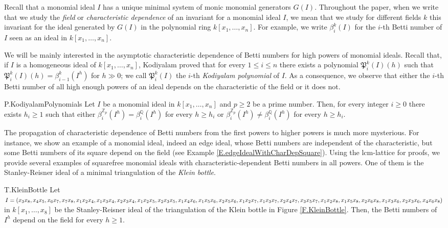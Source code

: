 \documentclass[11pt,oneside]{amsart}
\theoremstyle{plain}
\theoremstyle{definition}
\newcommand{\Q}{\mathbb{Q}}
\newcommand{\Z}{\mathbb{Z}}
\begin{document}
Recall that a monomial ideal $I$ has a unique minimal system of monic monomial generators $G(I)$.
Throughout the paper, when we write that we study the \textit{field} or \textit{characteristic dependence} of an invariant for a monomial ideal $I$, 
we mean that we study for different fields $k$ this invariant for the ideal generated by $G(I)$ in the polynomial ring $k[x_1, \dots, x_n]$. For example, we write $\beta_i^k(I)$ for the $i$-th Betti number of $I$ seen as an ideal in $k[x_1, \dots, x_n]$.   

We will be mainly interested in the asymptotic characteristic dependence of Betti numbers for high powers of monomial ideals. 
Recall that, if $I$ is a homogeneous ideal of $k[x_1,\dots,x_n]$, Kodiyalam \cite{K93} proved that for every $1 \leq i \leq n$ there exists a polynomial $\mathfrak{P}^k_i(I)(h)$ such that $\mathfrak{P}^k_i(I)(h)=\beta^k_{i-1}(I^h)$ for $h \gg 0$; we call $\mathfrak{P}^k_i(I)$ the $i$-th {\it Kodiyalam polynomial} of $I$. As a consequence, we observe that either the $i$-th Betti number of all high enough powers of an ideal depends on the characteristic of the field or it does not.

\begin{repproposition}{P.KodiyalamPolynomials}
Let $I$ be a monomial ideal in $k[x_1,\dots,x_n]$ and $p \geq 2$ be a prime number. Then, for every integer $i \geq 0$ there exists $h_i \geq 1$ such that either $\beta^{\Z_p}_i(I^h)=\beta^{\Q}_i(I^h)$ for every $h\geq h_i$ or $\beta^{\Z_p}_i(I^h) \neq \beta^{\Q}_i(I^h)$ for every $h\geq h_i$.
\end{repproposition}

The propagation of characteristic dependence of Betti numbers from the first powers to higher powers is much more mysterious. For instance, 
we show an example of a monomial ideal, indeed an edge ideal, whose Betti numbers are independent of the characteristic, but some Betti numbers of its square depend on the field (see Example \ref{E.edgeIdealWithCharDepSquare}). Using the lcm-lattice for proofs, we provide several examples of squarefree monomial ideals with characteristic-dependent Betti numbers in all powers. One of them is the Stanley-Reisner ideal of a minimal triangulation of the \textit{Klein bottle}.

\begin{reptheorem}{T.KleinBottle}
Let $I = (x_3x_8, x_4x_5, x_6x_7, x_7x_8, x_1x_2x_4, x_1x_3x_4, x_2x_3x_4, x_1x_2x_5, x_2x_3x_5, \break x_1x_4x_6, x_1x_5x_6, x_2x_5x_6, x_1x_2x_7, x_1x_3x_7, x_2x_4x_7, x_3x_5x_7,  x_1x_2x_8, x_1x_5x_8, x_2x_6x_8, x_1x_3x_6, \break x_2x_3x_6, x_4x_6x_8)$ in $k[x_1,\dots,x_8]$ be the Stanley-Reisner ideal of the triangulation of the Klein bottle in Figure \ref{F.KleinBottle}. Then, the Betti numbers of $I^h$ depend on the field for every $h \geq 1$.
\end{reptheorem}
\end{document}
